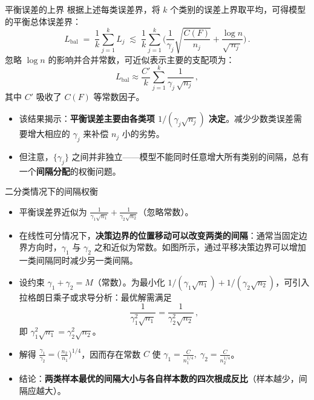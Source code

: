 \documentclass{beamer}
\begin{document}
\begin{frame}{平衡误差的上界}
    根据上述每类误差界，将 $k$ 个类别的误差上界取平均，可得模型的平衡总体误差界：
    \[
        L_{\text{bal}} \;=\; \frac{1}{k}\sum_{j=1}^k L_j \;\lesssim\; \frac{1}{k}\sum_{j=1}^k\!\Big( \frac{1}{\gamma_j}\sqrt{\frac{C(F)}{\,n_j\,}} + \frac{\log n}{\sqrt{\,n_j\,}}\Big)\,.
    \]
    忽略 $\log n$ 的影响并合并常数，可近似表示主要的支配项为：
    \[
        L_{\text{bal}} \approx \frac{C'}{k} \sum_{j=1}^k \frac{1}{\gamma_j\,\sqrt{n_j}}\,,
    \] 
    其中 $C'$ 吸收了 $C(F)$ 等常数因子。
    \begin{itemize}
        \item 该结果揭示：\textbf{平衡误差主要由各类项 $1/(\gamma_j\sqrt{n_j})$ 决定}。减少少数类误差需要增大相应的 $\gamma_j$ 来补偿 $n_j$ 小的劣势。
        \item 但注意，$\{\gamma_j\}$ 之间并非独立——模型不能同时任意增大所有类别的间隔，总有一个\textbf{间隔分配}的权衡问题。
    \end{itemize}
\end{frame}

\begin{frame}{二分类情况下的间隔权衡}
    \begin{itemize}
        \item 平衡误差界近似为 $ \frac{1}{\gamma_1\sqrt{n_1}} + \frac{1}{\gamma_2\sqrt{n_2}} $（忽略常数）。
        \item 在线性可分情况下，\textbf{决策边界的位置移动可以改变两类的间隔}：通常当固定边界方向时，$\gamma_1$ 与 $\gamma_2$ 之和近似为常数。如图所示，通过平移决策边界可以增加一类间隔同时减少另一类间隔。
        \item 设约束 $\gamma_1 + \gamma_2 = M$（常数）。为最小化 $1/(\gamma_1\sqrt{n_1}) + 1/(\gamma_2\sqrt{n_2})$，可引入拉格朗日乘子或求导分析：最优解需满足
        \[
            \frac{1}{\gamma_1^2\sqrt{n_1}} = \frac{1}{\gamma_2^2\sqrt{n_2}}\,,
        \] 
        即 $\gamma_1^2 \sqrt{n_1} = \gamma_2^2 \sqrt{n_2}$。
        \item 解得\; $\displaystyle \frac{\gamma_1}{\gamma_2} = \Big(\frac{n_2}{\,n_1}\Big)^{1/4}$，因而存在常数 $C$ 使 $\gamma_1 = \frac{C}{n_1^{1/4}},\;\gamma_2 = \frac{C}{n_2^{1/4}}$。
        \item 结论：\textbf{两类样本最优的间隔大小与各自样本数的四次根成反比}（样本越少，间隔应越大）。
    \end{itemize}
\end{frame}
\end{document}
